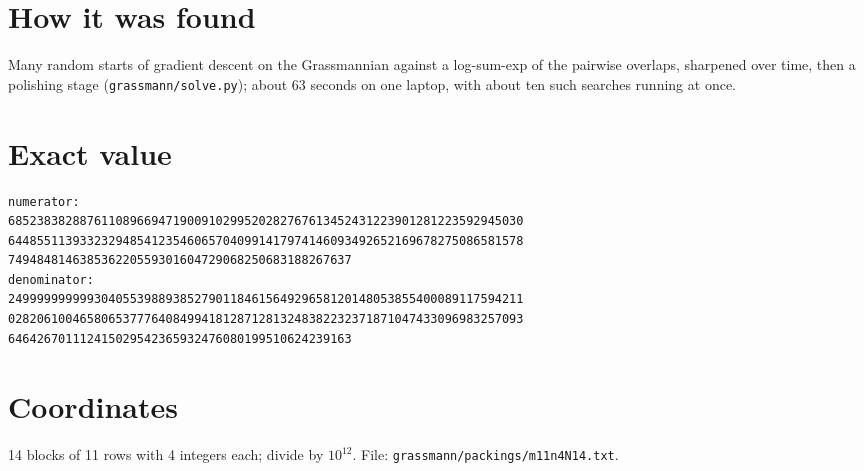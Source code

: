 \documentclass[11pt,a4paper]{article}
\begin{document}
\section{How it was found}
Many random starts of gradient descent on the Grassmannian against a log-sum-exp of the pairwise overlaps, sharpened over time, then a polishing stage (\texttt{grassmann/solve.py}); about 63 seconds on one laptop, with about ten such searches running at once.


\appendix
\section{Exact value}
{\small
\begin{verbatim}
numerator:
685238382887611089669471900910299520282767613452431223901281223592945030
644855113933232948541235460657040991417974146093492652169678275086581578
749484814638536220559301604729068250683188267637
denominator:
249999999999304055398893852790118461564929658120148053855400089117594211
028206100465806537776408499418128712813248382232371871047433096983257093
646426701112415029542365932476080199510624239163
\end{verbatim}}

\section{Coordinates}
14 blocks of 11 rows with 4 integers each; divide by $10^{12}$. File: \texttt{grassmann/packings/m11n4N14.txt}.
{\tiny
\begin{multicols}{3}
\end{multicols}}
\end{document}
